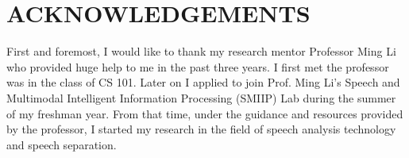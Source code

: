 

\section{ACKNOWLEDGEMENTS}\label{sec:acknowledgements}
First and foremost, I would like to thank my research mentor Professor Ming Li who provided huge help to me in the past three years.
I first met the professor was in the class of CS 101.
Later on I applied to join Prof. Ming Li's Speech and Multimodal Intelligent Information Processing (SMIIP) Lab during the summer of my freshman year.
From that time, under the guidance and resources provided by the professor, I started my research in the field of speech analysis technology and speech separation.

